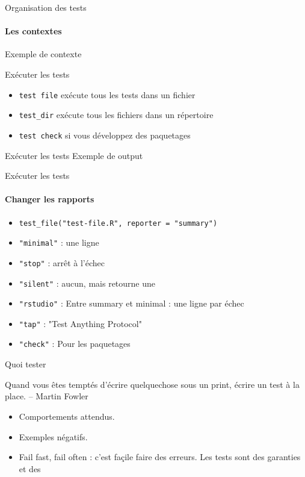 \documentclass[11pt]{beamer}
\begin{document}
\begin{frame}{Organisation des tests}
\framesubtitle{Les contextes}
Exemple de contexte
\end{frame}

\begin{frame}{Exécuter les tests}
\begin{itemize}
\item {\texttt{test\ file}} exécute tous les tests dans un fichier
\item {\texttt{test\_dir}} exécute tous les fichiers dans un répertoire
\item \texttt{test\ check} si vous développez des paquetages
\end{itemize}
\end{frame}

\begin{frame}{Exécuter les tests}
Exemple de output
\end{frame}

\begin{frame}{Exécuter les tests}
\framesubtitle{Changer les rapports}
\begin{itemize}
\item \texttt{test\_file("test-file.R", reporter = "summary")}
\item \texttt{"minimal"} : une ligne
\item \texttt{"stop"} : arrêt à l'échec
\item \texttt{"silent"} : aucun, mais retourne une 
\item \texttt{"rstudio"} : Entre summary et minimal : une ligne par échec
\item \texttt{"tap"} : "Test Anything Protocol"
\item \texttt{"check"} : Pour les paquetages
\end{itemize}
\end{frame}

\begin{frame}{Quoi tester}
\begin{block}{}
Quand vous êtes temptés d'écrire quelquechose sous un print, écrire un test à la place. -- Martin Fowler
\end{block}
\begin{itemize}
\item Comportements attendus.
\item Exemples négatifs. 
\item Fail fast, fail often : c'est façile faire des erreurs. Les tests sont des garanties et des 
\end{itemize}
\end{frame}
\end{document}

